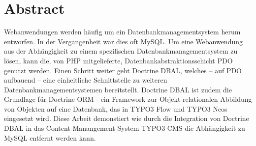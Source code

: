 \chapter{Abstract}
\label{ch:abstract}
Webanwendungen werden häufig um ein Datenbankmanagementsystem herum entworfen. In der Vergangenheit war dies oft MySQL. Um eine Webanwendung aus der Abhängigkeit zu einem spezifischen Datenbankmanagementsystem zu lösen, kann die, von PHP mitgelieferte, Datenbankabstraktionsschicht PDO genutzt werden. Einen Schritt weiter geht Doctrine DBAL, welches – auf PDO aufbauend – eine einheitliche Schnittstelle zu weiteren Datenbankmanagementsystemen bereitstellt. Doctrine DBAL ist zudem die Grundlage für Doctrine ORM - ein Framework zur Objekt-relationalen Abbildung von Objekten auf eine Datenbank, das in TYPO3 Flow und TYPO3 Neos eingesetzt wird. Diese Arbeit demonstiert wie durch die Integration von Doctrine DBAL in das Content-Manangement-System TYPO3 CMS die Abhängigkeit zu MySQL entfernt werden kann.
